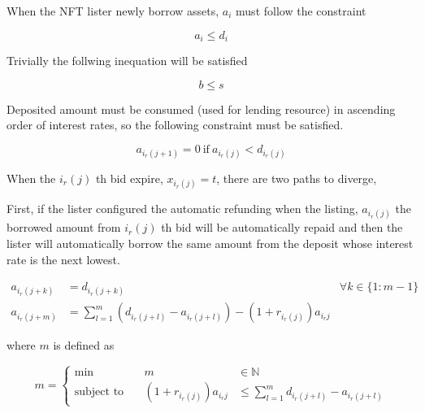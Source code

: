 \documentclass[dvipdfmx]{jsarticle}
\begin{document}
When the NFT lister newly borrow assets, $a_i$ must follow the constraint

$$
  a_i \le d_i
$$

Trivially the follwing inequation will be satisfied

$$
  b \le s
$$

Deposited amount must be consumed (used for lending resource) in ascending order of interest rates,
so the following constraint must be satisfied.

$$
  a_{i_r(j+1)} = 0 \ \text{if} \ a_{i_r(j)} < d_{i_r(j)}
$$

When the $i_r(j)$ th bid expire, $x_{i_r(j)} = t$, there are two paths to diverge,

First, if the lister configured the automatic refunding when the listing, $a_{i_r(j)}$ the borrowed amount from $i_r(j)$ th bid will be automatically repaid and then
the lister will automatically borrow the same amount from the deposit whose interest rate is the next lowest.

\begin{align}
  a_{i_r(j + k)} &= d_{i_r(j + k)} & \forall k \in \{1 : m-1\} \\
  a_{i_r(j + m)} &= \sum_{l=1}^m \left( d_{i_r(j+l)} - a_{i_r(j+l)} \right) - (1 + r_{i_r(j)}) a_{i_r{j}} &
\end{align}

where $m$ is defined as

$$
  m = \left\{\begin{aligned}
    \min && \ m & \in \mathbb{N} \\
    \text{subject to} && \ (1 + r_{i_r(j)}) a_{i_r{j}} & \le \sum_{l=1}^m {d_{i_r(j+l)} - a_{i_r(j+l)}}
  \end{aligned}\right.
$$
\end{document}
